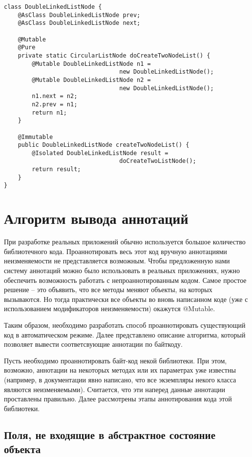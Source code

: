 \begin{lstlisting}[caption=DoubleLinkedListNode.java, label=code:circular_list_node_isolated]
class DoubleLinkedListNode {
    @AsClass DoubleLinkedListNode prev;
    @AsClass DoubleLinkedListNode next;
    
    @Mutable
    @Pure
    private static CircularListNode doCreateTwoNodeList() {
    	@Mutable DoubleLinkedListNode n1 = 
                                 new DoubleLinkedListNode();
        @Mutable DoubleLinkedListNode n2 = 
                                 new DoubleLinkedListNode();    	
        n1.next = n2;
        n2.prev = n1;    
        return n1;  
    }
    
    @Immutable
    public DoubleLinkedListNode createTwoNodeList() {
        @Isolated DoubleLinkedListNode result = 
                                 doCreateTwoListNode();
        return result;
    }
}
\end{lstlisting} 

\section{Алгоритм вывода аннотаций}

При разработке реальных приложений обычно используется большое количество библиотечного кода. Проаннотировать весь этот код вручную аннотациями неизменяемости не представляется возможным. Чтобы предложенную нами систему аннотаций можно было использовать в реальных приложениях, нужно обеспечить возможность работать с непроаннотированным кодом. Самое простое решение -- это объявить, что все методы меняют объекты, на которых вызываются. Но тогда практически все объекты во вновь написанном коде (уже с использованием модификаторов неизменяемости) окажутся @Mutable. 

Таким образом, необходимо разработать способ проаннотировать существующий код в автоматическом режиме. Далее представлено описание алгоритма, который позволяет вывести соответсвующие аннотации по байткоду. 

Пусть необходимо проаннотировать байт-код некой библиотеки. При этом, возможно, аннотации на некоторых методах или их параметрах уже известны (например, в документации явно написано, что все экземпляры некого класса являются неизменяемыми). Считается, что эти наперед данные аннотации проставлены правильно. Далее рассмотрены этапы аннотирования кода этой библиотеки.

\subsection{Поля, не входящие в абстрактное состояние объекта}

